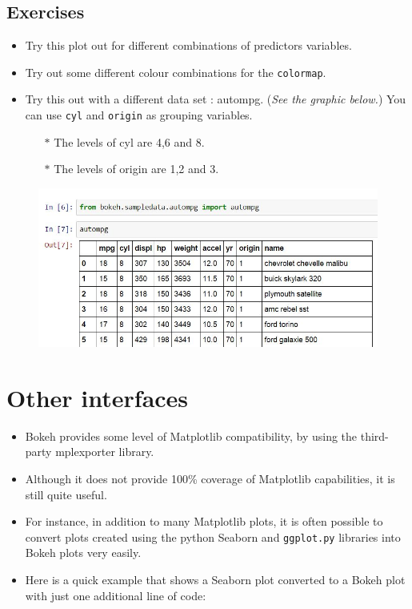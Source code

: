 \documentclass[12pt, a4paper]{report}
\begin{document}
\subsection*{Exercises}
\begin{itemize}
	\item Try this plot out for different combinations
	of predictors variables.
	\item Try out some different colour combinations for the \texttt{colormap}.
	\item Try this out with a different data set : autompg. (\textit{See the graphic below.})  You can use \texttt{cyl} and \texttt{origin} as grouping variables. \begin{itemize}\item[$\ast$] The levels of cyl are 4,6 and 8. \item[$\ast$] The levels of origin are 1,2 and 3.
	\end{itemize}
\end{itemize}
\begin{figure}[h!]
	\centering
	\includegraphics[width=0.9\linewidth]{images/autompg}
\end{figure}

\newpage
\section*{Other interfaces}
\begin{itemize}
	
	\item Bokeh provides some level of Matplotlib compatibility, by using the third-party mplexporter library. 
	\item Although it does not provide 100\% coverage of Matplotlib capabilities, it is still quite useful. 
	\item For instance, in addition to many Matplotlib plots, it is often possible to convert plots created using the python Seaborn and \texttt{ggplot.py} libraries into Bokeh plots very easily. \item Here is a quick example that shows a Seaborn plot converted to a Bokeh plot with just one additional line of code:
\end{itemize}
\newpage
\end{document}
